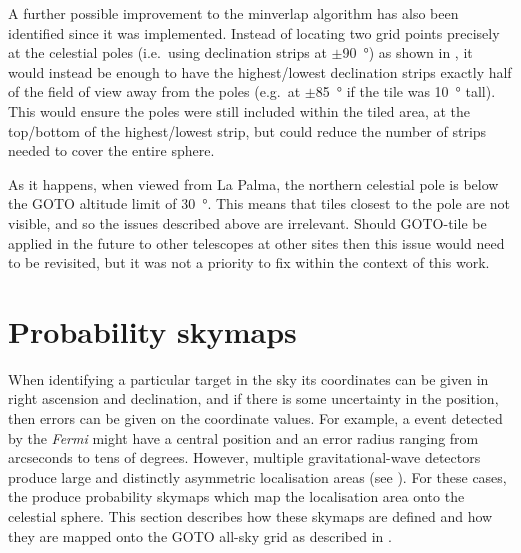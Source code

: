 \begin{colsection}
A further possible improvement to the minverlap algorithm has also been identified since it was implemented. Instead of locating two grid points precisely at the celestial poles (i.e.\ using declination strips at $\pm$\SI{90}{\degree}) as shown in , it would instead be enough to have the highest/lowest declination strips exactly half of the field of view away from the poles (e.g.\ at $\pm$\SI{85}{\degree} if the tile was \SI{10}{\degree} tall). This would ensure the poles were still included within the tiled area, at the top/bottom of the highest/lowest strip, but could reduce the number of strips needed to cover the entire sphere.

As it happens, when viewed from La Palma, the northern celestial pole is below the GOTO altitude limit of \SI{30}{\degree}. This means that tiles closest to the pole are not visible, and so the issues described above are irrelevant. Should GOTO-tile be applied in the future to other telescopes at other sites then this issue would need to be revisited, but it was not a priority to fix within the context of this work.

\end{colsection}


\section{Probability skymaps}
\label{sec:skymaps}


\begin{colsection}

When identifying a particular target in the sky its coordinates can be given in right ascension and declination, and if there is some uncertainty in the position, then errors can be given on the coordinate values. For example, a  event detected by the \textit{Fermi}  might have a central position and an error radius ranging from arcseconds to tens of degrees. However, multiple gravitational-wave detectors produce large and distinctly asymmetric localisation areas (see ). For these cases, the  produce probability skymaps which map the localisation area onto the celestial sphere. This section describes how these skymaps are defined and how they are mapped onto the GOTO all-sky grid as described in .

\end{colsection}

